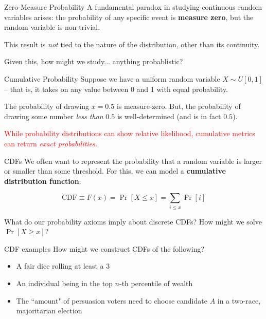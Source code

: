 \documentclass[10pt]{beamer}
\begin{document}
\begin{frame}{Zero-Measure Probability}
    A fundamental paradox in studying continuous random variables arises: the probability of any specific event is \textbf{measure zero}, but the random variable is non-trivial.

    This result is \emph{not} tied to the nature of the distribution, other than its continuity.

    Given this, how might we study... anything probablistic?
\end{frame}


\begin{frame}{Cumulative Probability}
Suppose we have a uniform random variable $X \sim U[0,1]$ -- that is, it takes on any value between 0 and 1 with equal probability. \pause

The probability of drawing $x = 0.5$ is measure-zero. But, the probability of drawing some number \emph{less than} $0.5$ is well-determined (and is in fact $0.5$). \pause

\textcolor{red}{While probability distributions can show relative likelihood, cumulative metrics can return \emph{exact probabilities.}}
\end{frame}



\begin{frame}{CDFs}
    We often want to represent the probability that a random variable is larger or smaller than some threshold. For this, we can model a \textbf{cumulative distribution function}:

    \[\text{CDF} \equiv F(x) = \Pr[X \leq x] = \sum_{i \leq x} \Pr[i]\]

    What do our probability axioms imply about discrete CDFs? How might we solve $\Pr[X \geq x]?$
\end{frame}

\begin{frame}{CDF examples}
    How might we construct CDFs of the following?

    \begin{itemize}
        \item A fair dice rolling at least a 3
        \item An individual being in the top $n$-th percentile of wealth
        \item The ``amount" of persuasion voters need to choose candidate $A$ in a two-race, majoritarian election
    \end{itemize}
\end{frame}
\end{document}
